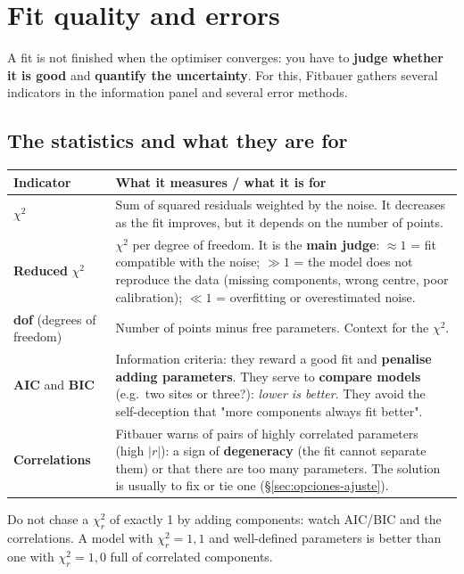 \section{Fit quality and errors}
\label{sec:calidad}

A fit is not finished when the optimiser converges: you have to \textbf{judge
whether it is good} and \textbf{quantify the uncertainty}. For this, Fitbauer
gathers several indicators in the information panel and several error methods.

\subsection{The statistics and what they are for}

\begin{center}
\begin{tabular}{@{}lp{}@{}}
\toprule
\textbf{Indicator} & \textbf{What it measures / what it is for} \\
\midrule
$\chi^2$ & Sum of squared residuals weighted by the noise. It decreases as the
fit improves, but it depends on the number of points. \\[3pt]
\textbf{Reduced} $\chi^2$ & $\chi^2$ per degree of freedom. It is the \textbf{main
judge}: $\approx 1$ = fit compatible with the noise; $\gg 1$ = the model does not
reproduce the data (missing components, wrong centre, poor calibration);
$\ll 1$ = overfitting or overestimated noise. \\[3pt]
\textbf{dof} (degrees of freedom) & Number of points minus free parameters. Context
for the $\chi^2$. \\[3pt]
\textbf{AIC} and \textbf{BIC} & Information criteria: they reward a good fit and
\textbf{penalise adding parameters}. They serve to \textbf{compare models}
(e.g.\ two sites or three?): \emph{lower is better}. They avoid the self-deception
that "more components always fit better". \\[3pt]
\textbf{Correlations} & Fitbauer warns of pairs of highly correlated parameters
(high $|r|$): a sign of \textbf{degeneracy} (the fit cannot separate them) or that
there are too many parameters. The solution is usually to fix or tie one
(§\ref{sec:opciones-ajuste}). \\
\bottomrule
\end{tabular}
\end{center}

\begin{truco}
Do not chase a $\chi^2_r$ of exactly 1 by adding components: watch AIC/BIC and the
correlations. A model with $\chi^2_r=1{,}1$ and well-defined parameters is better
than one with $\chi^2_r=1{,}0$ full of correlated components.
\end{truco}

